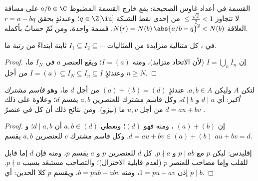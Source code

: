 \begin{omfigure}

{\small القسمة في أعداد غاوس الصحيحة: يقع خارج القسمة المضبوط
$a/b \in \C$ على مسافة لا تتجاوز $\leq \frac{\sqrt2}{2} < 1$ من إحدى نقط الشبكة
$q \in \Z[\iu]$؛ وعندئذٍ يحقق $r = a - bq$ العلاقة $N(r) =
N(b)\,\abs{a/b - q}^2 < N(b)$.
قسمة  واحدة، ومن ثَمّ حسابٌ بأكمله.}
\end{omfigure}

\begin{lemma}
\label{lem:b3:rings:acc}
في ، كل متتالية متزايدة من المثاليات $I_1 \subseteq I_2
\subseteq \cdots$
ثابتة ابتداءً من رتبة ما.
\end{lemma}

\begin{proof}
إن $I = \bigcup_n I_n$  (لأن الاتحاد متزايد)، ومنه $I =
(a)$؛ ويقع العنصر
$a$ في $I_N$ ما، وعندئذٍ $I = (a)
\subseteq I_N \subseteq I_n \subseteq I$ من أجل $n \geq N$.
\end{proof}

\begin{lemma}\label{lem:b3:rings:bezout}
لتكن $A$  وليكن $a, b \in A$. عندئذٍ $(a) + (b) = (d)$
من أجل $d$ ما، وهو \emph{قاسم مشترك أكبر}:
أي $d \mid a$ و $d \mid b$، وكل قاسم مشترك للعنصرين $a,
b$ يقسم
$d$؛ وعلاوة على ذلك $d = au + bv$ من أجل $u, v$ ما (بيزو). ومن
نتائج ذلك أن كل  في 
عنصرٌ .
\end{lemma}

\begin{proof}
إن $(a) + (b)$ ، ومنه فهو $(d)$؛ ويعطي $a, b \in (d)$ أن
$d \mid
a, b$؛ و $d = au + bv \in (a) + (b)$. وكل قاسم مشترك $c$ للعنصرين $a, b$ يقسم
$au + bv = d$.

إقليدس: ليكن $p$  مع $p \mid ab$ و $p \nmid a$.
كل  $d$ للعنصرين $p$ و $a$ يقسم $p$، ومنه فإن $d$
إما قابل للقلب وإما مصاحب للعنصر $p$ (لعدم قابلية الاختزال)؛
والتصاحب مستبعَد بسبب $p \nmid a$. إذن $1 = pu + av$، ومنه
$b = pub + abv$، ويقسم $p$ كلا الحدين: أي $p \mid b$.
\end{proof}

